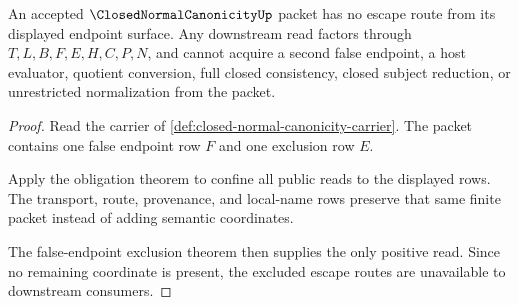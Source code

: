 \begin{theorem}
\label{thm:closed-normal-canonicity-nonescape}
An accepted $\ClosedNormalCanonicityUp$ packet has no escape route from its displayed endpoint surface. Any downstream read factors through $T,L,B,F,E,H,C,P,N$, and cannot acquire a second false endpoint, a host evaluator, quotient conversion, full closed consistency, closed subject reduction, or unrestricted normalization from the packet.
\end{theorem}
\begin{proof}
Read the carrier of \autoref{def:closed-normal-canonicity-carrier}. The packet contains one false endpoint row $F$ and one exclusion row $E$.

Apply the obligation theorem to confine all public reads to the displayed rows. The transport, route, provenance, and local-name rows preserve that same finite packet instead of adding semantic coordinates.

The false-endpoint exclusion theorem then supplies the only positive read. Since no remaining coordinate is present, the excluded escape routes are unavailable to downstream consumers.
\end{proof}


\begin{closurestatus}{\ClosedNormalCanonicityUp}
  \theoryclosure{\seedClosure}
  \formalstatus{\unformalizedV}
\end{closurestatus}
